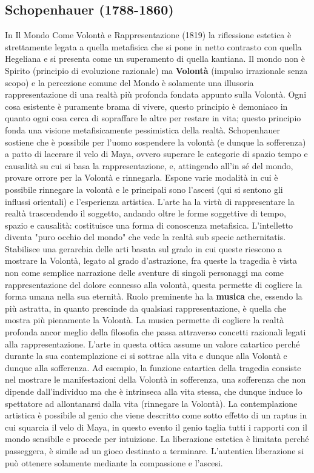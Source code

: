 \documentclass[10pt,a4paper]{article}
\begin{document}
\subsection{Schopenhauer (1788-1860)}
In Il Mondo Come Volontà e Rappresentazione (1819) la riflessione estetica è strettamente legata a quella metafisica che si pone in netto contrasto con quella Hegeliana e si presenta come un superamento di quella kantiana. Il mondo non è Spirito (principio di evoluzione razionale) ma \textbf{Volontà} (impulso irrazionale senza scopo) e la percezione comune del Mondo è solamente una illusoria rappresentazione di una realtà più profonda fondata appunto sulla Volontà. Ogni cosa esistente è puramente brama di vivere, questo principio è demoniaco in quanto ogni cosa cerca di sopraffare le altre per restare in vita; questo principio fonda una visione metafisicamente pessimistica della realtà. Schopenhauer sostiene che è possibile per l'uomo sospendere la volontà (e dunque la sofferenza) a patto di lacerare il velo di Maya, ovvero superare le categorie di spazio tempo e causalità su cui si basa la rappresentazione, e, attingendo all'in sé del mondo, provare orrore per la Volontà e rinnegarla. Espone varie modalità in cui è possibile rinnegare la volontà e le principali sono l'ascesi (qui si sentono gli influssi orientali) e l'esperienza artistica. L'arte ha la virtù di rappresentare la realtà trascendendo il soggetto, andando oltre le forme soggettive di tempo, spazio e causalità: costituisce una forma di conoscenza metafisica. L'intelletto diventa "puro occhio del mondo" che vede la realtà sub specie aethernitatis. Stabilisce una gerarchia delle arti basata sul grado in cui queste riescono a mostrare la Volontà, legato al grado d'astrazione, fra queste la tragedia è vista non come semplice narrazione delle sventure di singoli personaggi ma come rappresentazione del dolore connesso alla volontà, questa permette di cogliere la forma umana nella sua eternità. Ruolo preminente ha la \textbf{musica} che, essendo la più astratta, in quanto prescinde da qualsiasi rappresentazione, è quella che mostra più pienamente la Volontà. La musica permette di cogliere la realtà profonda ancor meglio della filosofia che passa attraverso concetti razionali legati alla rappresentazione. L'arte in questa ottica assume un valore catartico perché durante la sua contemplazione ci si sottrae alla vita e dunque alla Volontà e dunque alla sofferenza. Ad esempio, la funzione catartica della tragedia consiste nel mostrare le manifestazioni della Volontà in sofferenza, una sofferenza che non dipende dall'individuo ma che è intrinseca alla vita stessa, che dunque induce lo spettatore ad allontanarsi dalla vita (rinnegare la Volontà). La contemplazione artistica è possibile al genio che viene descritto come sotto effetto di un raptus in cui squarcia il velo di Maya, in questo evento il genio taglia tutti i rapporti con il mondo sensibile e procede per intuizione. La liberazione estetica è limitata perché passeggera, è simile ad un gioco destinato a terminare. L'autentica liberazione si può ottenere solamente mediante la compassione e l'ascesi.  
\end{document}
